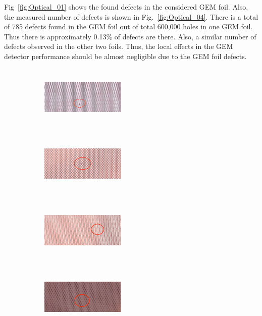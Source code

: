 Fig~\ref{fig:Optical_01} shows the found defects in the considered GEM foil. Also, the measured number of defects is shown in Fig.~\ref{fig:Optical_04}. There is a total of 785 defects found in the GEM foil out of total 600,000 holes in one GEM foil.
Thus there is approximately 0.13\% of defects are there.
Also, a similar number of defects observed in the other two foils. Thus, the local effects in the GEM detector performance should be almost negligible due to the GEM foil defects.
\begin{figure}[!htbp]
    \centering
    \begin{subfigure}[b]{0.29\textwidth}
        \includegraphics[width=4cm, height=3cm]{figures/GEM/figures/3a.jpg}
        \caption{ }
        \label{fig:O_4a}
    \end{subfigure}
    \begin{subfigure}[b]{0.29\textwidth}
        \includegraphics[width=4cm, height=3cm]{figures/GEM/figures/3b.jpg}
        \caption{ }
        \label{fig:O_4b}
    \end{subfigure}
    \centering
    \begin{subfigure}[b]{0.29\textwidth}
        \includegraphics[width=4cm, height=3cm]{figures/GEM/figures/3c.jpg}
        \caption{ }
        \label{fig:O_4c}
    \end{subfigure}
    \centering
    \begin{subfigure}[b]{0.29\textwidth}
        \includegraphics[width=4cm, height=3cm]{figures/GEM/figures/3d.jpg}

\end{subfigure}
\end{figure}
